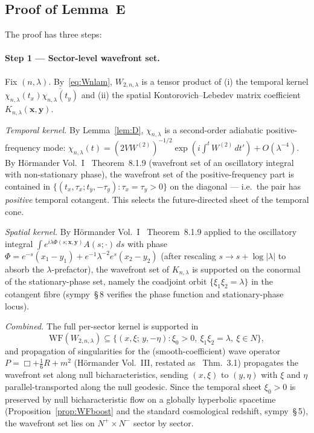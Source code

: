 \documentclass[11pt,a4paper]{article}
\theoremstyle{definition}
\newcommand{\WF}{\mathrm{WF}}
\begin{document}
\subsection{Proof of Lemma~E}

The proof has three steps:

\paragraph{Step 1 --- Sector-level wavefront set.}
Fix $(n,\lambda)$.  By~\eqref{eq:Wnlam}, $W_{2,n,\lambda}$ is a tensor product
of (i) the temporal kernel
$\chi_{n,\lambda}(t_x)\overline{\chi_{n,\lambda}(t_y)}$
and (ii) the spatial Kontorovich--Lebedev matrix coefficient
$K_{n,\lambda}(\boldsymbol{x},\boldsymbol{y})$.

\smallskip
\textit{Temporal kernel.}
By Lemma~\ref{lem:D}, $\chi_{n,\lambda}$ is a second-order adiabatic
positive-frequency mode: $\chi_{n,\lambda}(t) = (2VW^{(2)})^{-1/2}
\exp(i\int^t W^{(2)}\,dt') + O(\lambda^{-4})$.
By H\"ormander Vol.~I~\cite{Hor83} Theorem~8.1.9 (wavefront set of an
oscillatory integral with non-stationary phase), the wavefront set of the
positive-frequency part is contained in $\{(t_x,\tau_x;t_y,-\tau_y) :
\tau_x = \tau_y > 0\}$ on the diagonal --- i.e.\ the pair has
\emph{positive} temporal cotangent.  This selects the future-directed
sheet of the temporal cone.

\smallskip
\textit{Spatial kernel.}
By H\"ormander Vol.~I~\cite{Hor83} Theorem~8.1.9 applied to the oscillatory
integral $\int e^{i\lambda\Phi(s; \boldsymbol{x},\boldsymbol{y})} A(s;\cdot)\,ds$
with phase
$\Phi = e^{-s}(x_1-y_1)+e^{-1}\lambda^{-2}e^{s}(x_2-y_2)$
(after rescaling $s\to s+\log|\lambda|$ to absorb the $\lambda$-prefactor),
the wavefront set of $K_{n,\lambda}$ is supported on the conormal of the
stationary-phase set, namely the coadjoint orbit
$\{\xi_1 \xi_2 = \lambda\}$ in the cotangent fibre (sympy~\S\,8 verifies the
phase function and stationary-phase locus).

\smallskip
\textit{Combined.}
The full per-sector kernel is supported in
\[
  \WF(W_{2,n,\lambda})\subseteq\bigl\{(x,\xi;\,y,-\eta):
  \xi_0>0,\ \xi_1\xi_2 = \lambda,\ \xi\in N\bigr\},
\]
and propagation of singularities for the (smooth-coefficient) wave operator
$P=\Box+\tfrac{1}{6}R+m^2$ (H\"ormander Vol.~III, restated as
\cite{Rad96}~Thm.~3.1) propagates the wavefront set along null
bicharacteristics, sending $(x,\xi)$ to $(y,\eta)$ with $\xi$ and $\eta$
parallel-transported along the null geodesic.  Since the temporal sheet
$\xi_0>0$ is preserved by null bicharacteristic flow on a globally
hyperbolic spacetime (Proposition~\ref{prop:WFboost} and the standard
cosmological redshift, sympy~\S\,5), the wavefront set lies on
$N^+\times N^-$ sector by sector.
\end{document}
